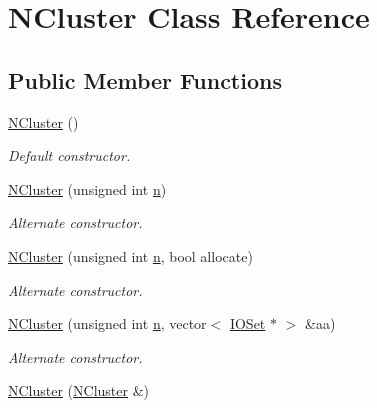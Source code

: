 \hypertarget{class_n_cluster}{
\section{NCluster Class Reference}
\label{class_n_cluster}
}
\subsection*{Public Member Functions}
\begin{DoxyCompactItemize}
\item 
\hypertarget{class_n_cluster_af90ad520f3efec3f3c0b93ba9f46debc}{
\hyperlink{class_n_cluster_af90ad520f3efec3f3c0b93ba9f46debc}{NCluster} ()}
\label{class_n_cluster_af90ad520f3efec3f3c0b93ba9f46debc}

\begin{DoxyCompactList}\small\item\em Default constructor. \item\end{DoxyCompactList}\item 
\hyperlink{class_n_cluster_ac6460cead5fb2cf1a46354ab26f36e0a}{NCluster} (unsigned int \hyperlink{class_n_cluster_a926e474ba279516160b52ab36d208a69}{n})
\begin{DoxyCompactList}\small\item\em Alternate constructor. \item\end{DoxyCompactList}\item 
\hyperlink{class_n_cluster_ad64a3005375dd6aad2848f227ce92ef6}{NCluster} (unsigned int \hyperlink{class_n_cluster_a926e474ba279516160b52ab36d208a69}{n}, bool allocate)
\begin{DoxyCompactList}\small\item\em Alternate constructor. \item\end{DoxyCompactList}\item 
\hyperlink{class_n_cluster_a5ef4833105e769e289f7e9dbf570dcef}{NCluster} (unsigned int \hyperlink{class_n_cluster_a926e474ba279516160b52ab36d208a69}{n}, vector$<$ \hyperlink{class_i_o_set}{IOSet} $\ast$ $>$ \&aa)
\begin{DoxyCompactList}\small\item\em Alternate constructor. \item\end{DoxyCompactList}\item 
\hypertarget{class_n_cluster_a7f86cfa4150010e117f7520f34bbc6a4}{
\hyperlink{class_n_cluster_a7f86cfa4150010e117f7520f34bbc6a4}{NCluster} (\hyperlink{class_n_cluster}{NCluster} \&)}
\label{class_n_cluster_a7f86cfa4150010e117f7520f34bbc6a4}


\end{DoxyCompactItemize}
